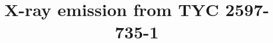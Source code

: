 \documentclass[linenumbers]{aastex631}
\begin{document}
\title{X-ray emission from TYC 2597-735-1}


\end{document}
